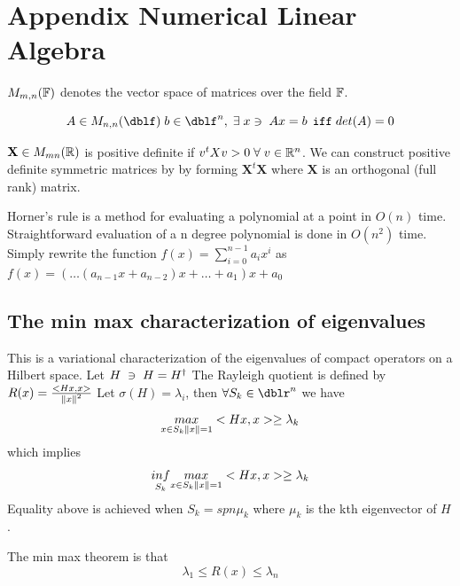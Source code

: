 \def\baselinestretch{1}

\chapter{Appendix Numerical Linear Algebra}
$M_{m,n}(\mathbb{F})$ denotes the vector space of matrices over
the field $\mathbb{F}$.

\[A \in M_{n,n}(\dblf) \; b \in \dblf^n,  \exts x  \ni \; Ax=b \,
\;\texttt{iff}\; det(A)=0\]

$\mathbf{X} \in M_{mn}(\mathbb{R})$ is positive definite if $
v^{t} X v > 0 \; \forall \; v \in \mathbb{R}^n$.  We can construct
positive definite symmetric matrices by by forming
$\mathbf{X}^{t} \mathbf{X}$ where $\mathbf{X}$ is an orthogonal
(full rank) matrix.

Horner's rule is a method for evaluating a polynomial at a
point in $O(n)$ time. Straightforward evaluation of a n degree
polynomial is done in $O(n^{2})$ time. Simply rewrite the
function $f(x)= \sum\limits_{i=0}^{n-1} {a}_i x^{i}$ as
$f(x)=(\ldots (a_{n-1}x + a_{n-2} )x +  \ldots + a_1)x+a_0$

\section{The min max characterization of eigenvalues}
This is a variational characterization of the eigenvalues of compact operators on a Hilbert space. Let $H \; \ni \; H=H^\dag$ The Rayleigh quotient is defined by $R(x) =  \frac{<Hx,x>}{\left\Vert x\right\Vert^2}$ Let $\sigma(H) ={\lambda_i}$, then $\forall S_k \in \dblr^n$ we have
\begin{equation*}
  \underset{x \in S_k \left\Vert x\right\Vert=1}{max} <Hx,x> \geq \lambda_k
\end{equation*}
which implies
\begin{equation*}
\underset{S_k}{inf}  \underset{x \in S_k \left\Vert x\right\Vert=1}{max} <Hx,x> \geq \lambda_k
\end{equation*}
Equality above is achieved when $S_k = spn{\mu_k}$ where $\mu_k$ is the kth eigenvector of $H$.

The min max theorem is that
\begin{equation*}
\lambda_1 \leq R(x) \leq \lambda_n
\end{equation*}




